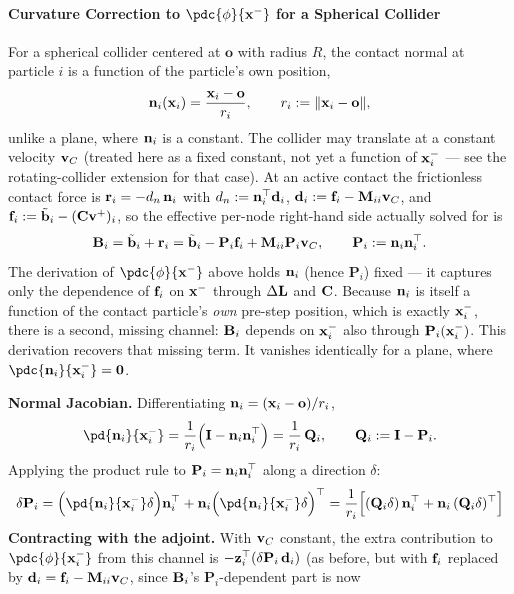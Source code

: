 \begin{derivation}
\paragraph{Curvature Correction to $\pdc{\phi}{\x^-}$ for a Spherical Collider} \mbox{}\par\medskip

\begin{reminder}
For a spherical collider centered at $\mathbf{o}$ with radius $R$, the contact normal at
particle $i$ is a function of the particle's own position,
$$
\mathbf{n}_i(\mathbf{x}_i) = \frac{\mathbf{x}_i-\mathbf{o}}{r_i}, \qquad r_i := \|\mathbf{x}_i-\mathbf{o}\|,
$$
unlike a plane, where $\mathbf{n}_i$ is a constant. The collider may translate at a constant velocity
$\mathbf{v}_C$ (treated here as a fixed constant, not yet a function of $\mathbf{x}_i^-$ — see the rotating-collider
extension for that case). At an active contact the frictionless contact force is
$\mathbf{r}_i = -d_n\,\mathbf{n}_i$ with $d_n := \mathbf{n}_i^\top\mathbf{d}_i$, $\mathbf{d}_i := \mathbf{f}_i - \mathbf{M}_{ii}\mathbf{v}_C$, and
$\mathbf{f}_i := \tilde{\mathbf{b}}_i - (\mathbf{C}\mathbf{v}^+)_i$, so the effective per-node right-hand side actually solved for is
$$
\mathbf{B}_i = \tilde{\mathbf{b}}_i + \mathbf{r}_i = \tilde{\mathbf{b}}_i - \mathbf{P}_i\mathbf{f}_i + \mathbf{M}_{ii}\mathbf{P}_i\mathbf{v}_C, \qquad \mathbf{P}_i := \mathbf{n}_i\mathbf{n}_i^\top.
$$
The derivation of $\pdc{\phi}{\x^-}$ above holds $\mathbf{n}_i$ (hence $\mathbf{P}_i$) fixed — it captures
only the dependence of $\mathbf{f}_i$ on $\mathbf{x}^-$ through $\Delta\mathbf{L}$ and $\mathbf{C}$. Because $\mathbf{n}_i$ is itself
a function of the contact particle's \emph{own} pre-step position, which is exactly $\mathbf{x}_i^-$,
there is a second, missing channel: $\mathbf{B}_i$ depends on $\mathbf{x}_i^-$ also through $\mathbf{P}_i(\mathbf{x}_i^-)$.
This derivation recovers that missing term. It vanishes identically for a plane, where
$\pdc{\n_i}{\x_i^-}=\zero$.
\end{reminder}
\textbf{Normal Jacobian.} Differentiating $\mathbf{n}_i=(\mathbf{x}_i-\mathbf{o})/r_i$,
$$
\pd{\n_i}{\x_i^-} = \frac1{r_i}\Big(\I - \n_i\n_i^\top\Big) = \frac1{r_i}\,\mathbf{Q}_i,
\qquad
\mathbf{Q}_i := \I-\mathbf{P}_i.
$$
Applying the product rule to $\mathbf{P}_i=\mathbf{n}_i\mathbf{n}_i^\top$ along a direction $\delta$:
$$
\delta\mathbf{P}_i = \Big(\pd{\n_i}{\x_i^-}\delta\Big)\n_i^\top + \n_i\Big(\pd{\n_i}{\x_i^-}\delta\Big)^\top
= \frac1{r_i}\Big[(\mathbf{Q}_i\delta)\,\n_i^\top + \n_i\,(\mathbf{Q}_i\delta)^\top\Big]
$$
\newline \textbf{Contracting with the adjoint.} With $\mathbf{v}_C$ constant, the extra contribution to
$\pdc{\phi}{\x_i^-}$ from this channel is $-\mathbf{z}_i^\top(\delta\mathbf{P}_i\,\mathbf{d}_i)$ (as before, but with
$\mathbf{f}_i$ replaced by $\mathbf{d}_i=\mathbf{f}_i-\mathbf{M}_{ii}\mathbf{v}_C$, since $\mathbf{B}_i$'s $\mathbf{P}_i$-dependent part is now

\end{derivation}
